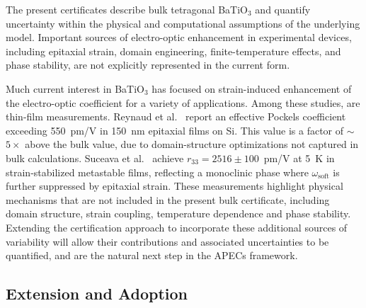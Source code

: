 \documentclass[prb,twocolumn,superscriptaddress,amsmath,amssymb,longbibliography]{revtex4-2}
\begin{document}
The present certificates describe bulk tetragonal BaTiO$_3$ and quantify uncertainty within the physical and computational assumptions of the underlying model. Important sources of electro-optic enhancement in experimental devices, including epitaxial strain, domain engineering, finite-temperature effects,  and phase stability, are not explicitly represented in the current form. 

Much current interest in BaTiO$_3$ has focused on strain-induced enhancement of the electro-optic coefficient for a variety of applications. Among these studies, are thin-film measurements.  Reynaud et al.\ \cite{Reynaud2025} report an effective Pockels coefficient exceeding 550~pm/V in 150~nm epitaxial films on Si. This value is a factor of $\sim$$5\times$ above the bulk value, due to domain-structure optimizations not captured in bulk calculations. Suceava et al.\ \cite{Suceava2025} achieve $r_{33} = 2516 \pm 100$~pm/V at 5~K in strain-stabilized metastable films, reflecting a monoclinic phase where $\omega_{\mathrm{soft}}$ is further suppressed by epitaxial strain. These measurements highlight physical mechanisms that are not included in the present bulk certificate, including domain structure, strain coupling, temperature dependence and phase stability. Extending the certification approach to incorporate these additional sources of variability will allow their contributions and associated uncertainties to be quantified, and are the natural next step in the APECs framework.

\subsection{Extension and Adoption}
\end{document}
